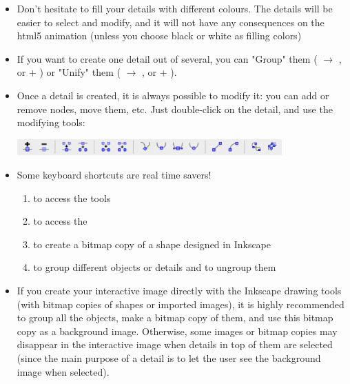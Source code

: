 \begin{itemize}
 \item Don't hesitate to fill your details with different colours. 
The details will be easier to select and modify, and it will not 
have any consequences on the html5 animation (unless you choose black or white as filling colors)
 \item If you want to create one detail out of several, you can "Group" them 
 ( $\rightarrow$ , or \Ctrl + ) or "Unify" them 
 ( $\rightarrow$ , or \Ctrl + \keystroke{+}).
 \item Once a detail is created, it is always possible to modify it: you can add or remove
 nodes, move them, etc. Just double-click on the detail, and use the modifying tools:\\
 \begin{center}
 \includegraphics[width=0.8\textwidth]{./images/modifynodes}\\  
 \end{center}
 \item Some keyboard shortcuts are real time savers!
 \begin{enumerate}
  \item {} to access the  tools
  \item {} to access the 
  \item {} to create a bitmap copy of a shape designed in Inkscape
  \item {} to group different objects or details 
  and  to ungroup them
 \end{enumerate} 
 \item If you create your interactive image directly with the Inkscape drawing tools (with bitmap copies of shapes or 
 imported images), it is highly recommended to group all the objects, make a bitmap copy of them, and use 
 this bitmap copy as a background image. Otherwise, some images or bitmap copies may disappear in the interactive image when 
 details in top of them are selected (since the main purpose of a detail is to 
 let the user see the background image when selected).
\end{itemize}

\listoffigures
\listoftables


